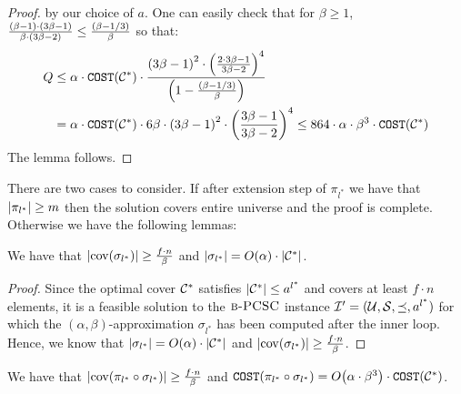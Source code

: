 \begin{proof}
        by our choice of $a$. One can easily check that for $\beta\geq 1$, $\frac{\mathopen{}\left( \beta-1 \right)\cdot \mathopen{}\left( 3\beta-1 \right)}{\beta\cdot\mathopen{}\left( 3\beta-2 \right)}\leq \frac{\mathopen{}\left( \beta-1/3 \right)}{\beta}$ so that:
        \begin{align*}
            Q&\leq
            \alpha\cdot\texttt{COST}\mathopen{}\left( \mathcal{C}^{*} \right)\cdot\frac{\mathopen{}\left( 3\beta-1 \right)^2\cdot\mathopen{}\left( \frac{2\cdot 3\beta-1}{3\beta-2} \right)^4}{\mathopen{}\left( 1-\frac{\mathopen{}\left( \beta-1/3 \right)}{\beta} \right)}
            \\&=
            \alpha\cdot\texttt{COST}\mathopen{}\left( \mathcal{C}^{*} \right)\cdot 6\beta\cdot \mathopen{}\left( 3\beta-1 \right)^2\cdot \mathopen{}\left( \frac{3\beta-1}{3\beta-2} \right)^4
            \leq 864\cdot\alpha\cdot\beta^3\cdot\texttt{COST}\mathopen{}\left( \mathcal{C}^{*} \right)
        \end{align*}
        The lemma follows.
    \end{proof}

    There are two cases to consider. If after extension step of $\pi_{l^*}$ we have that $\mathopen{}\left| \pi_{l^*} \right| \geq m$ then the solution covers entire universe and the proof is complete. Otherwise we have the following lemmas:
    \begin{lemma}\label{lem:sigma-coverage}
        We have that $\mathopen{}\left| \operatorname{cov}\mathopen{}\left( \sigma_{l^*} \right) \right| \geq \frac{f\cdot n}{\beta}$ and $\mathopen{}\left| \sigma_{l^*} \right| = O\mathopen{}\left( \alpha \right)\cdot \mathopen{}\left| \mathcal{C}^{*} \right|$.
    \end{lemma}
    \begin{proof}
        Since the optimal cover $\mathcal{C}^{*}$ satisfies $\mathopen{}\left| \mathcal{C}^{*} \right|\leq a^{l^*}$ and covers at least $f\cdot n$ elements, it is a feasible solution to the $\textup{\textsc{b-PCSC}}$ instance $\mathcal{I}'=(\mathcal{U},\mathcal{S},\preceq,a^{l^*})$ for which the $(\alpha,\beta)$-approximation $\sigma_{l^*}$ has been computed after the inner loop.
        Hence, we know that $\mathopen{}\left| \sigma_{l^*} \right| = O\mathopen{}\left( \alpha \right)\cdot \mathopen{}\left| \mathcal{C}^{*} \right|$ and $\mathopen{}\left| \operatorname{cov}\mathopen{}\left( \sigma_{l^*} \right) \right| \geq \frac{f\cdot n}{\beta}$.
    \end{proof}
    \begin{lemma}\label{lem:combined-coverage-cost}
        We have that $\mathopen{}\left| \operatorname{cov}\mathopen{}\left( \pi_{l^*} \circ \sigma_{l^*} \right) \right|\geq \frac{f\cdot n}{\beta}$ and $\texttt{COST}\mathopen{}\left( \pi_{l^*} \circ \sigma_{l^*} \right) = O\mathopen{}\left( \alpha\cdot\beta^3 \right)\cdot \texttt{COST}\mathopen{}\left( \mathcal{C}^{*} \right)$.
    \end{lemma}
